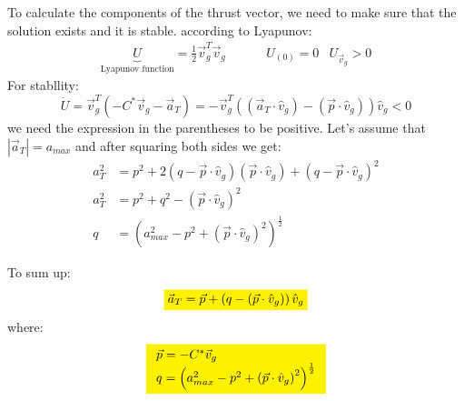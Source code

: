 \documentclass[11pt, a4paper]{article}
\begin{document}
\noindent To calculate the components of the thrust vector, we need to make sure that the solution exists and it is stable. according to Lyapunov:
\begin{equation}
    \begin{array}{ccc}
        \underbrace{U}_\text{Lyapunov function} = \frac{1}{2}\vec{v}_g^T\vec{v}_g \hspace{1cm} & U_{(0)}=0 & U_{\vec{v}_g}>0
    \end{array}
\end{equation}
For stabllity:
\begin{equation}
    \dot{U}=\vec{v}_g^T\left(-C^*\vec{v}_g-\vec{a}_T\right) = -\vec{v}_g^T\left(\left(\vec{a}_T\cdot\hat{v}_g\right)-\left(\vec{p}\cdot\hat{v}_g\right)\right)\hat{v}_g < 0
\end{equation}
we need the expression in the parentheses to be positive. Let's assume that $|\vec{a}_T|=a_{max}$ and after squaring both sides we get:
\begin{align}
    a_T^2&=p^2+2\left(q-\vec{p}\cdot\hat{v}_g\right)\left(\vec{p}\cdot\hat{v}_g\right)+\left(q-\vec{p}\cdot\hat{v}_g\right)^2 \\
    a_T^2&=p^2+q^2-\left(\vec{p}\cdot\hat{v}_g\right)^2 \\
    q&=\left(a_{max}^2-p^2+\left(\vec{p}\cdot\hat{v}_g\right)^2\right)^{\frac{1}{2}}
\end{align}

\noindent To sum up:
\begin{equation*}
    \colorbox{yellow}{$\vec{a}_T=\vec{p}+\left(q-\left(\vec{p}\cdot\hat{v}_g\right)\right)\hat{v}_g$}
\end{equation*}
where:
\begin{equation*}
    \colorbox{yellow}{$ \begin{array}{l}
        \vec{p} = -C^*\vec{v}_g \\
        q =\left(a_{max}^2-p^2+\left(\vec{p}\cdot\hat{v}_g\right)^2\right)^{\frac{1}{2}}
    \end{array} $}
\end{equation*}
\end{document}
